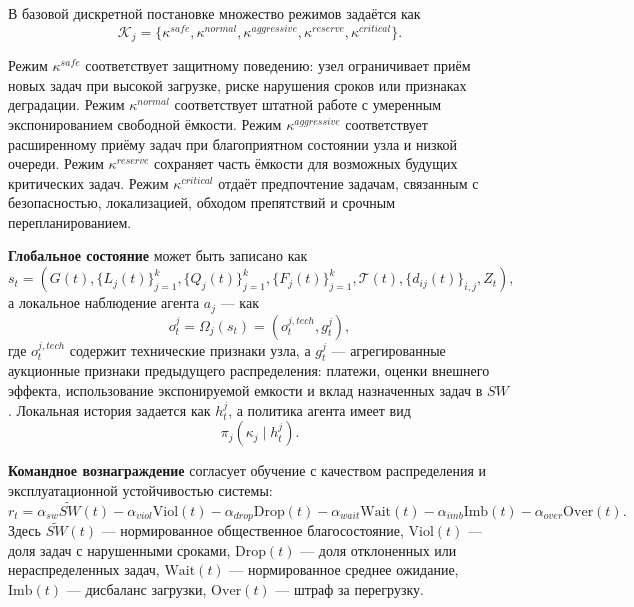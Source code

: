 \documentclass[a4paper,14pt]{extarticle}
\begin{document}
В базовой дискретной постановке множество режимов задаётся как
\begin{equation}
	\mathcal{K}_j =
	\{
	\kappa^{safe},
	\kappa^{normal},
	\kappa^{aggressive},
	\kappa^{reserve},
	\kappa^{critical}
	\}.
	\label{eq:ch4_action_set}
\end{equation}

Режим $\kappa^{safe}$ соответствует защитному поведению: узел ограничивает приём новых задач при высокой загрузке, риске нарушения сроков или признаках деградации. Режим $\kappa^{normal}$ соответствует штатной работе с умеренным экспонированием свободной ёмкости. Режим $\kappa^{aggressive}$ соответствует расширенному приёму задач при благоприятном состоянии узла и низкой очереди. Режим $\kappa^{reserve}$ сохраняет часть ёмкости для возможных будущих критических задач. Режим $\kappa^{critical}$ отдаёт предпочтение задачам, связанным с безопасностью, локализацией, обходом препятствий и срочным перепланированием.

\textbf{Глобальное состояние} может быть записано как
\begin{equation}
	s_t=\left(G(t),\{L_j(t)\}_{j=1}^{k},\{Q_j(t)\}_{j=1}^{k},\{F_j(t)\}_{j=1}^{k},\mathcal{T}(t),\{d_{ij}(t)\}_{i,j},Z_t\right),
	\label{eq:nir_state}
\end{equation}
а локальное наблюдение агента $a_j$ --- как
\begin{equation}
	o^j_t=\Omega_j(s_t)=\left(o^{j,tech}_t,g^j_t\right),
	\label{eq:nir_observation}
\end{equation}
где $o^{j,tech}_t$ содержит технические признаки узла, а $g^j_t$ --- агрегированные аукционные признаки предыдущего распределения: платежи, оценки внешнего эффекта, использование экспонируемой емкости и вклад назначенных задач в $SW$. Локальная история задается как $h^j_t$, а политика агента имеет вид
\begin{equation}
	\pi_j(\kappa_j\mid h^j_t).
	\label{eq:nir_local_policy}
\end{equation}

\textbf{Командное вознаграждение} согласует обучение с качеством распределения и эксплуатационной устойчивостью системы:
\begin{equation}
	r_t=\alpha_{sw}\widetilde{SW}(t)-\alpha_{viol}\mathrm{Viol}(t)-\alpha_{drop}\mathrm{Drop}(t)-\alpha_{wait}\mathrm{Wait}(t)-\alpha_{imb}\mathrm{Imb}(t)-\alpha_{over}\mathrm{Over}(t).
	\label{eq:nir_reward}
\end{equation}
Здесь $\widetilde{SW}(t)$ --- нормированное общественное благосостояние, $\mathrm{Viol}(t)$ --- доля задач с нарушенными сроками, $\mathrm{Drop}(t)$ --- доля отклоненных или нераспределенных задач, $\mathrm{Wait}(t)$ --- нормированное среднее ожидание, $\mathrm{Imb}(t)$ --- дисбаланс загрузки, $\mathrm{Over}(t)$ --- штраф за перегрузку.
\end{document}
